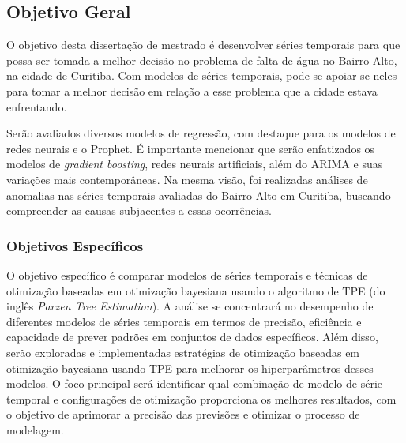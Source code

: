 \subsection{Objetivo Geral} \label{subsec:objetivos}

O objetivo desta dissertação de mestrado é desenvolver séries temporais para que possa ser tomada a melhor decisão no problema de falta de água no Bairro Alto, na cidade de Curitiba. Com modelos de séries temporais, pode-se apoiar-se neles para tomar a melhor decisão em relação a esse problema que a cidade estava enfrentando.

Serão avaliados diversos modelos de regressão, com destaque para os modelos de redes neurais e o Prophet. É importante mencionar que serão enfatizados os modelos de \textit{gradient boosting}, redes neurais artificiais, além do ARIMA e suas variações mais contemporâneas. Na mesma visão, foi realizadas análises de anomalias nas séries temporais avaliadas do Bairro Alto em Curitiba, buscando compreender as causas subjacentes a essas ocorrências.
    
    
\subsubsection{Objetivos Espec\'ificos} \label{subsubsec:obespec}
    
O objetivo específico é comparar modelos de séries temporais e técnicas de otimização baseadas em otimização bayesiana usando o algoritmo de TPE (do inglês \textit{Parzen Tree Estimation}). A análise se concentrará no desempenho de diferentes modelos de séries temporais em termos de precisão, eficiência e capacidade de prever padrões em conjuntos de dados específicos. Além disso, serão exploradas e implementadas estratégias de otimização baseadas em otimização bayesiana usando TPE para melhorar os hiperparâmetros desses modelos. O foco principal será identificar qual combinação de modelo de série temporal e configurações de otimização proporciona os melhores resultados, com o objetivo de aprimorar a precisão das previsões e otimizar o processo de modelagem.
    

